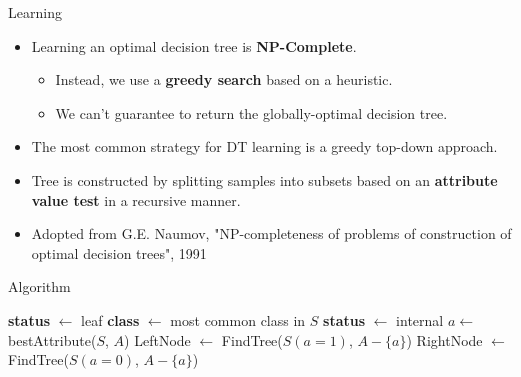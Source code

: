 \documentclass[serif, aspectratio=169]{beamer}
\begin{document}
\begin{frame}{Learning}
    \begin{itemize}
        \itemsep1em
        \justifying
        \item Learning an optimal decision tree is \textbf{NP-Complete}.
        \begin{itemize}
            \itemsep0.25em
            \item Instead, we use a \textbf{greedy search} based on a heuristic.
            \item We can't guarantee to return the globally-optimal decision tree.
        \end{itemize}
        \item The most common strategy for DT learning is a greedy top-down approach.
        \item Tree is constructed by splitting samples into subsets based on an \textbf{attribute value test} in a recursive manner.
        \item[] \begin{center}
            Adopted from G.E. Naumov, "NP-completeness of problems of construction of optimal decision trees", 1991
        \end{center}
    \end{itemize}
\end{frame}

\begin{frame}{Algorithm}
    \begin{algorithm}[H]
    \caption{Constructing DT}\label{alg:DT}
    \begin{algorithmic}[1]
     
            \State \textbf{status} $\gets$ leaf
            \State \textbf{class} $\gets$ most common class in $S$
        \Else
            \State \textbf{status} $\gets$ internal
            \State $a \gets$ \textcolor{deepred}{bestAttribute($S$, $A$)} 
            \State LeftNode $\gets$ FindTree($S(a=1)$, $A - \{a\}$)
            \State RightNode $\gets$ FindTree($S(a=0)$, $A - \{a\}$)
        \EndIf
    \EndProcedure
    \end{algorithmic}
    \end{algorithm}
\end{frame}
\end{document}
